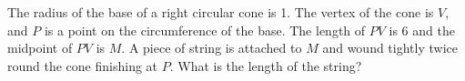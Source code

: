 The radius of the base of a right circular cone is 1. The vertex of the cone is
$V$, and $P$ is a point on the circumference of the base. The length of $PV$ is
6 and the midpoint of $PV$ is $M$. A piece of string is attached to $M$ and
wound tightly twice round the cone finishing at $P$. What is the length of the
string?
